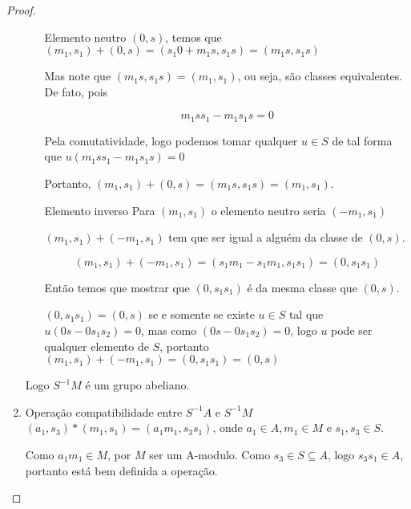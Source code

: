 \documentclass[10pt,a4paper]{article}
\begin{document}
\begin{proof}
\begin{enumerate}
\begin{enumerate}
			\item[Elemento neutro] $(0,s)$, temos que $(m_1,s_1)+(0,s)=(s_1 0+m_1s,s_1s)=(m_1s,s_1s)$
			
			Mas note que $(m_1s,s_1s)=(m_1,s_1)$, ou seja, são classes equivalentes. De fato, pois 
			
			$$m_1ss_1-m_1s_1s=0$$
			
			Pela comutatividade, logo podemos tomar qualquer $u \in S$ de tal forma que $u(m_1ss_1-m_1s_1s)=0$
			
			Portanto, $(m_1,s_1)+(0,s)=(m_1s,s_1s)=(m_1,s_1)$.
			
			\item[Elemento inverso] Para $(m_1,s_1)$ o elemento neutro seria $(-m_1,s_1)$
			
			$(m_1,s_1)+(-m_1,s_1)$ tem que ser igual a alguém da classe de $(0,s)$. 
			
			$$(m_1,s_1)+(-m_1,s_1)=(s_1m_1-s_1m_1, s_1s_1)=(0,s_1s_1)$$
			
			Então temos que mostrar que $(0,s_1s_1)$ é da mesma classe que $(0,s)$.
			
			$(0,s_1s_1)=(0,s)$ se e somente se existe $u \in S$ tal que $u(0s-0s_1s_2)=0$, mas como $(0s-0s_1s_2)=0$, logo $u$ pode ser qualquer elemento de $S$, portanto $(m_1,s_1)+(-m_1,s_1)=(0,s_1s_1)=(0,s)$
		\end{enumerate}
		
		Logo $S^{-1}M$ é um grupo abeliano.
		
		\item Operação compatibilidade entre $S^{-1}A$ e $S^{-1}M$
		$(a_1,s_3)*(m_1,s_1)=(a_1m_1,s_3s_1)$, onde $a_1\in A, m_1 \in M$ e $s_1, s_3 \in S$.
		
		Como $a_1m_1 \in M$, por $M$ ser um A-modulo. Como  $s_3 \in S \subseteq A$, logo $s_3s_1 \in A$, portanto está bem definida a operação.
		
	\end{enumerate}
\end{proof}
\end{document}
